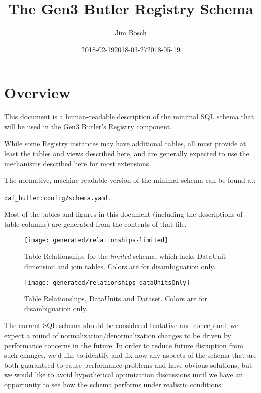 \documentclass[DM,toc]{lsstdoc}
\title{The Gen3 Butler Registry Schema}
\author{Jim Bosch}
\date{2018-02-19}
\date{2018-03-27}
\date{2018-05-19}
\begin{document}
\maketitle

\section{Overview}
\label{sec:overview}

This document is a human-readable description of the minimal SQL schema that will be used in the Gen3 Butler's Registry component.

While some Registry instances may have additional tables, all must provide at least the tables and views described here, and are generally expected to use the mechanisms described here for most extensions.

The normative, machine-readable version of the minimal schema can be found at:

\verb`daf_butler:config/schema.yaml`.

Most of the tables and figures in this document (including the descriptions of table columns) are generated from the contents of that file.

\begin{figure}
    \centering
    \texttt{[image: generated/relationships-limited]}
    \caption{Table Relationships for the \emph{limited} schema, which lacks
    DataUnit dimension and join tables. Colors are for disambiguation only.}
    \label{fig:relationships-limited}
\end{figure}

\begin{figure}
    \centering
    \texttt{[image: generated/relationships-dataUnitsOnly]}
    \caption{Table Relationships, DataUnits and Dataset. Colors are for disambiguation only.}
    \label{fig:relationships-dataUnitsOnly}
\end{figure}


The current SQL schema should be considered tentative and conceptual; we expect a round of normalization/denormalization changes to be driven by performance concerns in the future.
In order to reduce future disruption from such changes, we'd like to identify and fix now any aspects of the schema that are both guaranteed to cause performance problems and have obvious solutions, but we would like to avoid hypothetical optimization discussions until we have an opportunity to see how the schema performs under realistic conditions.
\end{document}
